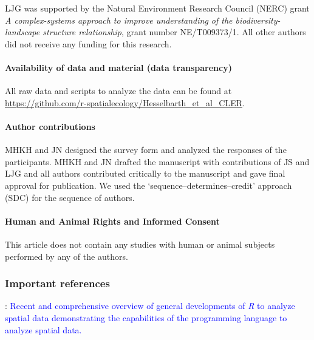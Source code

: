 \documentclass[smallextended]{svjour3}       %
\begin{document}
LJG was supported by the Natural Environment Research Council (NERC) grant \textit{A complex-systems approach to improve understanding of the biodiversity-landscape structure relationship}, grant number NE/T009373/1.
All other authors did not receive any funding for this research.

\hypertarget{availability-of-data-and-material-data-transparency}{%
\paragraph{Availability of data and material (data transparency)}\label{availability-of-data-and-material-data-transparency}}

All raw data and scripts to analyze the data can be found at \url{https://github.com/r-spatialecology/Hesselbarth_et_al_CLER}.

\hypertarget{author-contributions}{%
\paragraph{Author contributions}\label{author-contributions}}

MHKH and JN designed the survey form and analyzed the responses of the participants.
MHKH and JN drafted the manuscript with contributions of JS and LJG and all authors contributed critically to the manuscript and gave final approval for publication.
We used the `sequence--determines--credit' approach (SDC) for the sequence of authors.

\hypertarget{human-and-animal-rights-and-informed-consent}{%
\paragraph{Human and Animal Rights and Informed Consent}\label{human-and-animal-rights-and-informed-consent}}

This article does not contain any studies with human or animal subjects performed by any of the authors.

\hypertarget{important-references}{%
\subsubsection{Important references}\label{important-references}}

\noindent \textbullet \textbullet \cite{Bivand2020}: \textcolor{blue}{Recent and comprehensive overview of general developments of \textit{R} to analyze spatial data demonstrating the capabilities of the programming language to analyze spatial data.}
\end{document}
